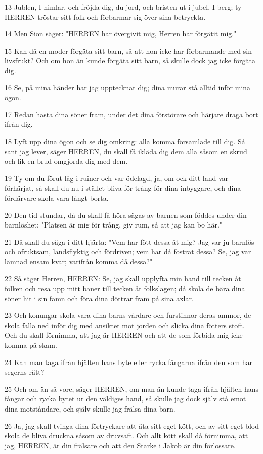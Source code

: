 \par 13 Jublen, I himlar, och fröjda dig, du jord, och bristen ut i jubel, I berg; ty HERREN tröstar sitt folk och förbarmar sig över sina betryckta.
\par 14 Men Sion säger: "HERREN har övergivit mig, Herren har förgätit mig."
\par 15 Kan då en moder förgäta sitt barn, så att hon icke har förbarmande med sin livsfrukt? Och om hon än kunde förgäta sitt barn, så skulle dock jag icke förgäta dig.
\par 16 Se, på mina händer har jag upptecknat dig; dina murar stå alltid inför mina ögon.
\par 17 Redan hasta dina söner fram, under det dina förstörare och härjare draga bort ifrån dig.
\par 18 Lyft upp dina ögon och se dig omkring: alla komma församlade till dig. Så sant jag lever, säger HERREN, du skall få ikläda dig dem alla såsom en skrud och lik en brud omgjorda dig med dem.
\par 19 Ty om du förut låg i ruiner och var ödelagd, ja, om ock ditt land var förhärjat, så skall du nu i stället bliva för trång för dina inbyggare, och dina fördärvare skola vara långt borta.
\par 20 Den tid stundar, då du skall få höra sägas av barnen som föddes under din barnlöshet: "Platsen är mig för trång, giv rum, så att jag kan bo här."
\par 21 Då skall du säga i ditt hjärta: "Vem har fött dessa åt mig? Jag var ju barnlös och ofruktsam, landsflyktig och fördriven; vem har då fostrat dessa? Se, jag var lämnad ensam kvar; varifrån komma då dessa?"
\par 22 Så säger Herren, HERREN: Se, jag skall upplyfta min hand till tecken åt folken och resa upp mitt baner till tecken åt folkslagen; då skola de bära dina söner hit i sin famn och föra dina döttrar fram på sina axlar.
\par 23 Och konungar skola vara dina barns vårdare och furstinnor deras ammor, de skola falla ned inför dig med ansiktet mot jorden och slicka dina fötters stoft. Och du skall förnimma, att jag är HERREN och att de som förbida mig icke komma på skam.
\par 24 Kan man taga ifrån hjälten hans byte eller rycka fångarna ifrån den som har segerns rätt?
\par 25 Och om än så vore, säger HERREN, om man än kunde taga ifrån hjälten hans fångar och rycka bytet ur den väldiges hand, så skulle jag dock själv stå emot dina motståndare, och själv skulle jag frälsa dina barn.
\par 26 Ja, jag skall tvinga dina förtryckare att äta sitt eget kött, och av sitt eget blod skola de bliva druckna såsom av druvsaft. Och allt kött skall då förnimma, att jag, HERREN, är din frälsare och att den Starke i Jakob är din förlossare.

